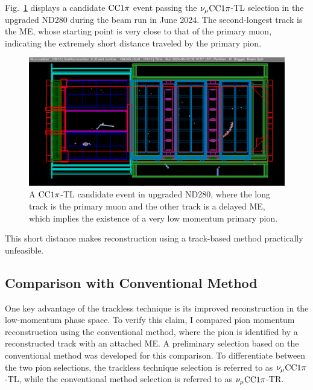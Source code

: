           Fig.~\ref{fig:cc1pi-tl} displays a candidate $\textrm{CC}1\pi$ event passing the $\nu_{\mu}\textrm{CC}1\pi$-TL selection in the upgraded ND280 during the beam run in June 2024. 
          The second-longest track is the ME, whose starting point is very close to that of the primary muon, indicating the extremely short distance traveled by the primary pion. 
          \begin{figure}[!htb] 	
               \centering 		
               \includegraphics[width=\sgfigwid\textwidth]{figures/shortPion.png}
               \caption{\label{fig:cc1pi-tl} A $\textrm{CC}1\pi$-TL candidate event in upgraded ND280, where the long track is the primary muon and the other track is a delayed ME, which implies the existence of a very low momentum primary pion.} 
          \end{figure}
          This short distance makes reconstruction using a track-based method practically unfeasible.

     \subsection{Comparison with Conventional Method}
     \label{sec:comparison-conventional}

          One key advantage of the trackless technique is its improved reconstruction in the low-momentum phase space. 
          To verify this claim, I compared pion momentum reconstruction using the conventional method, where the pion is identified by a reconstructed track with an attached ME. 
          A preliminary selection based on the conventional method was developed for this comparison. 
          To differentiate between the two pion selections, the trackless technique selection is referred to as $\nu_{\mu}\textrm{CC}1\pi$-TL, while the conventional method selection is referred to as $\nu_{\mu}\textrm{CC}1\pi$-TR.

